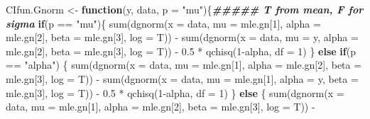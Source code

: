 \documentclass[
]{article}
\newenvironment{Shaded}{\begin{snugshade}}{\end{snugshade}}
\newcommand{\AttributeTok}[1]{\textcolor[rgb]{0.77,0.63,0.00}{#1}}
\newcommand{\ControlFlowTok}[1]{\textcolor[rgb]{0.13,0.29,0.53}{\textbf{#1}}}
\newcommand{\DecValTok}[1]{\textcolor[rgb]{0.00,0.00,0.81}{#1}}
\newcommand{\DocumentationTok}[1]{\textcolor[rgb]{0.56,0.35,0.01}{\textbf{\textit{#1}}}}
\newcommand{\FloatTok}[1]{\textcolor[rgb]{0.00,0.00,0.81}{#1}}
\newcommand{\FunctionTok}[1]{\textcolor[rgb]{0.00,0.00,0.00}{#1}}
\newcommand{\NormalTok}[1]{#1}
\newcommand{\OtherTok}[1]{\textcolor[rgb]{0.56,0.35,0.01}{#1}}
\newcommand{\SpecialCharTok}[1]{\textcolor[rgb]{0.00,0.00,0.00}{#1}}
\newcommand{\StringTok}[1]{\textcolor[rgb]{0.31,0.60,0.02}{#1}}
\begin{document}
\begin{Shaded}
\begin{Highlighting}[]
\NormalTok{CIfun.Gnorm }\OtherTok{\textless{}{-}} \ControlFlowTok{function}\NormalTok{(y, data, }\AttributeTok{p =} \StringTok{"mu"}\NormalTok{)\{}\DocumentationTok{\#\#\#\#\# T from mean, F for sigma}
  \ControlFlowTok{if}\NormalTok{(p }\SpecialCharTok{==} \StringTok{"mu"}\NormalTok{)\{}
    \FunctionTok{sum}\NormalTok{(}\FunctionTok{dgnorm}\NormalTok{(}\AttributeTok{x =}\NormalTok{ data, }\AttributeTok{mu =}\NormalTok{ mle.gn[}\DecValTok{1}\NormalTok{], }\AttributeTok{alpha =}\NormalTok{ mle.gn[}\DecValTok{2}\NormalTok{], }\AttributeTok{beta =}\NormalTok{ mle.gn[}\DecValTok{3}\NormalTok{], }\AttributeTok{log =}\NormalTok{ T)) }\SpecialCharTok{{-}}
      \FunctionTok{sum}\NormalTok{(}\FunctionTok{dgnorm}\NormalTok{(}\AttributeTok{x =}\NormalTok{ data, }\AttributeTok{mu =}\NormalTok{ y, }\AttributeTok{alpha =}\NormalTok{ mle.gn[}\DecValTok{2}\NormalTok{], }\AttributeTok{beta =}\NormalTok{ mle.gn[}\DecValTok{3}\NormalTok{], }\AttributeTok{log =}\NormalTok{ T)) }\SpecialCharTok{{-}} 
      \FloatTok{0.5} \SpecialCharTok{*} \FunctionTok{qchisq}\NormalTok{(}\DecValTok{1}\SpecialCharTok{{-}}\NormalTok{alpha, }\AttributeTok{df =} \DecValTok{1}\NormalTok{)}
\NormalTok{  \} }\ControlFlowTok{else} \ControlFlowTok{if}\NormalTok{(p }\SpecialCharTok{==} \StringTok{"alpha"}\NormalTok{) \{}
    \FunctionTok{sum}\NormalTok{(}\FunctionTok{dgnorm}\NormalTok{(}\AttributeTok{x =}\NormalTok{ data, }\AttributeTok{mu =}\NormalTok{ mle.gn[}\DecValTok{1}\NormalTok{], }\AttributeTok{alpha =}\NormalTok{ mle.gn[}\DecValTok{2}\NormalTok{], }\AttributeTok{beta =}\NormalTok{ mle.gn[}\DecValTok{3}\NormalTok{], }\AttributeTok{log =}\NormalTok{ T)) }\SpecialCharTok{{-}}
      \FunctionTok{sum}\NormalTok{(}\FunctionTok{dgnorm}\NormalTok{(}\AttributeTok{x =}\NormalTok{ data, }\AttributeTok{mu =}\NormalTok{ mle.gn[}\DecValTok{1}\NormalTok{], }\AttributeTok{alpha =}\NormalTok{ y, }\AttributeTok{beta =}\NormalTok{ mle.gn[}\DecValTok{3}\NormalTok{], }\AttributeTok{log =}\NormalTok{ T)) }\SpecialCharTok{{-}} 
      \FloatTok{0.5} \SpecialCharTok{*} \FunctionTok{qchisq}\NormalTok{(}\DecValTok{1}\SpecialCharTok{{-}}\NormalTok{alpha, }\AttributeTok{df =} \DecValTok{1}\NormalTok{) }
\NormalTok{  \} }\ControlFlowTok{else}\NormalTok{ \{}
    \FunctionTok{sum}\NormalTok{(}\FunctionTok{dgnorm}\NormalTok{(}\AttributeTok{x =}\NormalTok{ data, }\AttributeTok{mu =}\NormalTok{ mle.gn[}\DecValTok{1}\NormalTok{], }\AttributeTok{alpha =}\NormalTok{ mle.gn[}\DecValTok{2}\NormalTok{], }\AttributeTok{beta =}\NormalTok{ mle.gn[}\DecValTok{3}\NormalTok{], }\AttributeTok{log =}\NormalTok{ T)) }\SpecialCharTok{{-}}

\end{Highlighting}
\end{Shaded}
\end{document}
